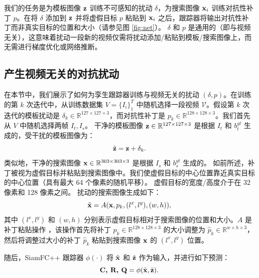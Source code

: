 我们的任务是为模板图像 $\textbf z$ 训练不可感知的扰动 $\delta$，为搜索图像 $\textbf x_i$ 训练对抗性补丁 $p$。在将 $\delta$ 添加到 $\textbf z$ 并将虚假目标 $p$ 粘贴到 $\textbf x_i$ 之后，跟踪器将输出对抗性补丁而非真实目标的位置和大小（请参见图 \ref{fig:net}）。
$\delta$ 和 $p$ 是通用的（即与视频无关），这意味着扰动一段新的视频仅需将扰动添加/粘贴到模板/搜索图像上，而无需进行梯度优化或网络推断。

\subsection{产生视频无关的对抗扰动}
在本节中，我们展示了如何为孪生跟踪器训练与视频无关的扰动 $(\delta, p)$。在训练的第 $k$ 次迭代中，从训练数据集 $V=\{I_i\}_1^T$ 中随机选择一段视频 $\mathcal V$。假设第 $k$ 次迭代的模板扰动是 $\delta_k \in \mathbb{R}^{127\times 127 \times 3}$，而对抗性补丁是 $p_k \in \mathbb{R}^{128\times 128\times 3}$。我们首先从 $V$ 中随机选择两帧 $I_t, I_s$。
干净的模板图像 $\textbf z\in \mathbb{R}^{127\times 127 \times 3}$ 是根据 $I_t$ 和 $b^{gt}_t$ 生成的，受干扰的模板图像为：
\begin{equation}
\tilde {\textbf z} = \textbf z + \delta_k.
\end{equation}
类似地，干净的搜索图像 $\textbf x \in \mathbb{R}^{303\times 303 \times 3}$ 是根据 $I_s$ 和 $b^{gt}_s$ 生成的。
如前所述，补丁被视为虚假目标并粘贴到搜索图像中。我们使虚假目标的中心位置靠近真实目标的中心位置（具有最大 64 个像素的随机平移）。
虚假目标的宽度/高度介于在 32 像素和 128 像素之间。
扰动的搜索图像生成如下：
\begin{equation}
\tilde{\textbf x} = A(\textbf x, p_k, (l^x, l^y), (w, h)),
\end{equation}
其中 $(l^x, l^y)$ 和 $(w, h)$ 分别表示虚假目标相对于搜索图像的位置和大小。$A$ 是补丁粘贴操作 \cite{patch}，该操作首先将补丁 $p_k \in \mathbb{R}^{128\times 128\times 3}$ 的大小调整为 $\hat{p}_k \in \mathbb{R}^{w\times h\times 3}$，然后将调整过大小的补丁 $\hat{p}_k$ 粘贴到搜索图像 $\textbf x$ 的 $(l^x,l^y)$ 位置。

随后，SiamFC++ 跟踪器 $\phi(\cdot)$ 将 $\tilde {\textbf x}$ 和 $\tilde{\textbf z}$ 作为输入，并进行如下预测：
\begin{equation}
\textbf{C, R, Q} = \phi(\tilde {\textbf x}, \tilde{\textbf z}).
\end{equation}

